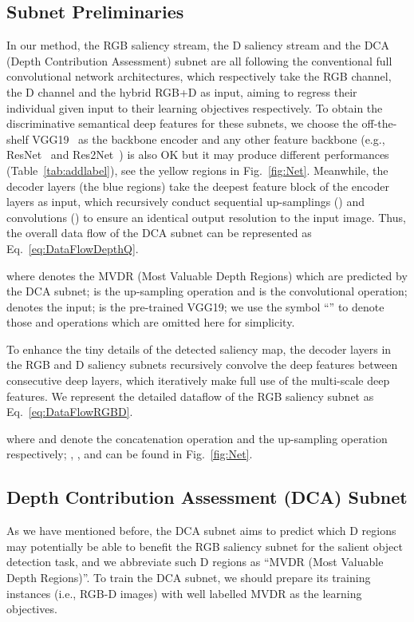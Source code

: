\documentclass[journal]{IEEEtran}
\begin{document}
\subsection{Subnet Preliminaries}
\label{sec:SNP}
In our method, the RGB saliency stream, the D saliency stream and the DCA (Depth Contribution Assessment) subnet are all following the conventional full convolutional network architectures, which respectively take the RGB channel, the D channel and the hybrid RGB+D as input, aiming to regress their individual given input to their learning objectives respectively.
To obtain the discriminative semantical deep features for these subnets, we choose the off-the-shelf VGG19~\cite{simonyan2014very} as the backbone encoder and any other feature backbone (e.g., ResNet~\cite{he2016deep} and Res2Net~\cite{gao2019res2net}) is also OK but it may produce different performances (Table~\ref{tab:addlabel}), see the yellow regions in Fig.~\ref{fig:Net}.
Meanwhile, the decoder layers (the blue regions) take the deepest feature block of the encoder layers as input, which recursively conduct sequential up-samplings () and convolutions () to ensure an identical output resolution to the input image.
Thus, the overall data flow of the DCA subnet can be represented as Eq.~\ref{eq:DataFlowDepthQ}.

where  denotes the MVDR (Most Valuable Depth Regions) which are predicted by the DCA subnet;  is the up-sampling operation and  is the convolutional operation;  denotes the  input;  is the pre-trained VGG19; we use the symbol ``'' to denote those  and  operations which are omitted here for simplicity.

To enhance the tiny details of the detected saliency map, the decoder layers in the RGB and D saliency subnets recursively convolve the deep features between consecutive deep layers, which iteratively make full use of the multi-scale deep features.
We represent the detailed dataflow of the RGB saliency subnet as Eq.~\ref{eq:DataFlowRGBD}.

where  and  denote the concatenation operation and the up-sampling operation respectively; , ,  and  can be found in Fig.~\ref{fig:Net}.

\subsection{Depth Contribution Assessment (DCA) Subnet}
\label{sec:DQSN}
As we have mentioned before, the DCA subnet aims to predict which D regions may potentially be able to benefit the RGB saliency subnet for the salient object detection task, and we abbreviate such D regions as ``MVDR (Most Valuable Depth Regions)''.
To train the DCA subnet, we should prepare its training instances (i.e., RGB-D images) with well labelled MVDR as the learning objectives.
\end{document}
